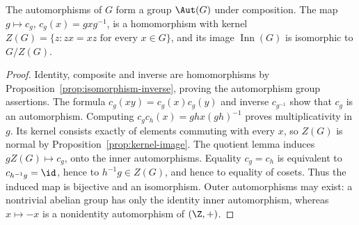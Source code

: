 \begin{proposition}\label{prop:inner-automorphisms}
The automorphisms of $G$ form a group $\Aut(G)$ under composition. The map $g\mapsto c_g$, $c_g(x)=gxg^{-1}$, is a homomorphism with kernel
$Z(G)=\{z:zx=xz\text{ for every }x\in G\}$, and its image $\operatorname{Inn}(G)$ is isomorphic to $G/Z(G)$.
\end{proposition}
\begin{proof}
Identity, composite and inverse are homomorphisms by Proposition~\ref{prop:isomorphism-inverse}, proving the automorphism group assertions. The formula $c_g(xy)=c_g(x)c_g(y)$ and inverse $c_{g^{-1}}$ show that $c_g$ is an automorphism. Computing $c_gc_h(x)=ghx(gh)^{-1}$ proves multiplicativity in $g$. Its kernel consists exactly of elements commuting with every $x$, so $Z(G)$ is normal by Proposition~\ref{prop:kernel-image}. The quotient lemma induces $gZ(G)\mapsto c_g$, onto the inner automorphisms. Equality $c_g=c_h$ is equivalent to $c_{h^{-1}g}=\id$, hence to $h^{-1}g\in Z(G)$, and hence to equality of cosets. Thus the induced map is bijective and an isomorphism. Outer automorphisms may exist: a nontrivial abelian group has only the identity inner automorphism, whereas $x\mapsto-x$ is a nonidentity automorphism of $(\Z,+)$.
\end{proof}
